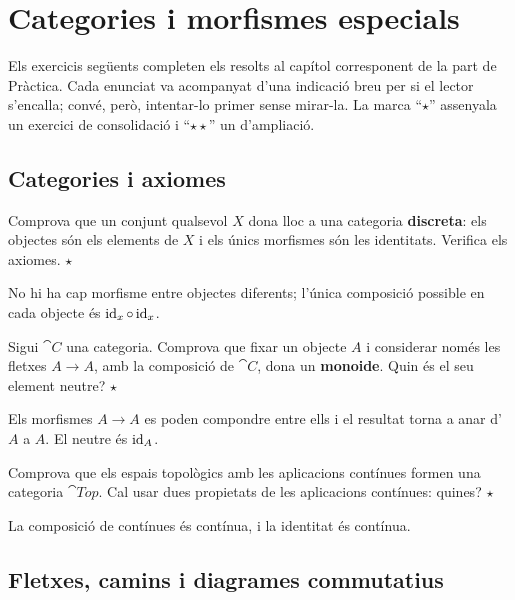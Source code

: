 \chapter[Categories]{Categories i morfismes especials}

Els exercicis següents completen els resolts al capítol corresponent de la part de Pràctica. Cada enunciat va acompanyat d'una indicació breu per si el lector s'encalla; convé, però, intentar-lo primer sense mirar-la. La marca \enquote{$\star$} assenyala un exercici de consolidació i \enquote{$\star\star$} un d'ampliació.

\section{Categories i axiomes}

\begin{exercici}
Comprova que un conjunt qualsevol $X$ dona lloc a una categoria \textbf{discreta}: els objectes són els elements de $X$ i els únics morfismes són les identitats. Verifica els axiomes. \hfill{\normalfont$\star$}
\begin{indicacio}
No hi ha cap morfisme entre objectes diferents; l'única composició possible en cada objecte és $\operatorname{id}_x\circ\operatorname{id}_x$.
\end{indicacio}
\end{exercici}

\begin{exercici}
Sigui $\cat{C}$ una categoria. Comprova que fixar un objecte $A$ i considerar només les fletxes $A\to A$, amb la composició de $\cat{C}$, dona un \textbf{monoide}. Quin és el seu element neutre? \hfill{\normalfont$\star$}
\begin{indicacio}
Els morfismes $A\to A$ es poden compondre entre ells i el resultat torna a anar d'$A$ a $A$. El neutre és $\operatorname{id}_A$.
\end{indicacio}
\end{exercici}

\begin{exercici}
Comprova que els espais topològics amb les aplicacions contínues formen una categoria $\cat{Top}$. Cal usar dues propietats de les aplicacions contínues: quines? \hfill{\normalfont$\star$}
\begin{indicacio}
La composició de contínues és contínua, i la identitat és contínua.
\end{indicacio}
\end{exercici}

\section{Fletxes, camins i diagrames commutatius}

